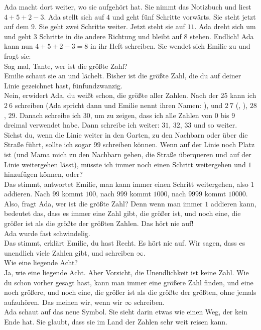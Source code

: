 Ada macht dort weiter, wo sie aufgehört hat. 
Sie nimmt das Notizbuch und liest $4 + 5 + 2 - 3$. 
Ada stellt sich auf $4$ und geht fünf Schritte vorwärts. 
Sie steht jetzt auf dem $9$. 
Sie geht zwei Schritte weiter. Jetzt steht sie auf $11$. 
Ada dreht sich um und geht $3$ Schritte in die andere Richtung und bleibt auf $8$ stehen.
Endlich! Ada kann nun $4 + 5 + 2 - 3 = 8$ in ihr Heft schreiben.
Sie wendet sich Emilie zu und fragt sie:\\
\frqq{}Sag mal, Tante, wer ist die größte Zahl?\flqq{}\\
Emilie schaut sie an und lächelt.
\frqq{}Bisher ist die größte Zahl, die du auf deiner Linie gezeichnet hast, fünfundzwanzig.\flqq{}\\
\frqq{}Nein\flqq{}, erwidert Ada, \frqq{}du weißt schon, die größte aller Zahlen. Nach der 25 kann ich $2~6$ schreiben (Ada spricht dann  und Emilie nennt ihren Namen: ), und $2~7$ (, ), $28$, $29$. Danach schreibe ich $30$, um zu zeigen, dass ich alle Zahlen von $0$ bis $9$ dreimal verwendet habe. Dann schreibe ich weiter: $31$, $32$, $33$ und so weiter. Siehst du, wenn die Linie weiter in den Garten, zu den Nachbarn oder über die Straße führt, sollte ich sogar $99$ schreiben können. Wenn auf der Linie noch Platz ist (und Mama mich zu den Nachbarn gehen, die Straße überqueren und auf der Linie weitergehen lässt), müsste ich immer noch einen Schritt weitergehen und $1$ hinzufügen können, oder?\flqq{}\\
\frqq{} Das stimmt\flqq{}, antwortet Emilie, \frqq{}man kann immer einen Schritt weitergehen, also $1$ addieren. Nach $99$ kommt $100$, nach $999$ kommt $1000$, nach $9999$ kommt $10000$.\flqq{}\\
\frqq{}Also\flqq{}, fragt Ada, \frqq{}wer ist die größte Zahl? Denn wenn man immer $1$ addieren kann, bedeutet das, dass es immer eine Zahl gibt, die größer ist, und noch eine, die größer ist als die größte der größten Zahlen. Das hört nie auf!\flqq{}\\ 
Ada wurde fast schwindelig. \\
\frqq{}Das stimmt\flqq{}, erklärt Emilie, \frqq{}du hast Recht. Es hört nie auf. Wir sagen, dass es unendlich viele Zahlen gibt, und schreiben $\infty$.\flqq{}\\
\frqq{}Wie eine liegende Acht?\flqq{}\\
\frqq{}Ja, wie eine liegende Acht. Aber Vorsicht, die Unendlichkeit ist keine Zahl. Wie du schon vorher gesagt hast, kann man immer eine größere Zahl finden, und eine noch größere, und noch eine, die größer ist als die größte der größten, ohne jemals aufzuhören. Das meinen wir, wenn wir $\infty$ schreiben.\flqq{}\\
Ada schaut auf das neue Symbol. Sie sieht darin etwas wie einen Weg, der kein Ende hat. Sie glaubt, dass sie im Land der Zahlen sehr weit reisen kann.

